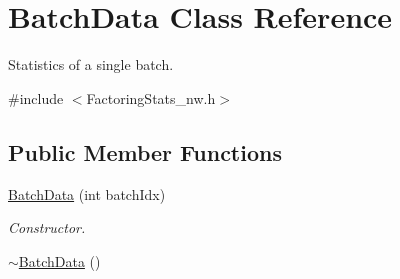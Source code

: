 \hypertarget{class_batch_data}{\section{Batch\-Data Class Reference}
\label{class_batch_data}
}


Statistics of a single batch.  




{\ttfamily \#include $<$Factoring\-Stats\-\_\-nw.\-h$>$}

\subsection*{Public Member Functions}
\begin{DoxyCompactItemize}
\item 
\hyperlink{class_batch_data_a42d0d69acb80a85ab740fd5bdc933051}{Batch\-Data} (int batch\-Idx)
\begin{DoxyCompactList}\small\item\em Constructor. \end{DoxyCompactList}\item 
\hypertarget{class_batch_data_ad55477d0f59b5076e7efcc7711c04e90}{\hyperlink{class_batch_data_ad55477d0f59b5076e7efcc7711c04e90}{$\sim$\-Batch\-Data} ()}\label{class_batch_data_ad55477d0f59b5076e7efcc7711c04e90}


\end{DoxyCompactItemize}
